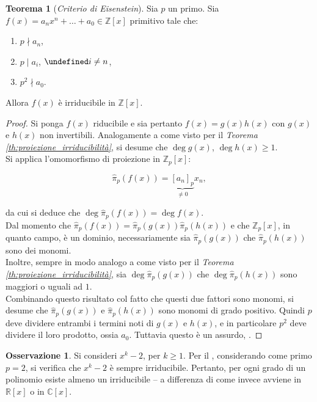 \documentclass[a4paper]{article}
\newcommand{\CCx}{\mathbb{C}[x]}
\newcommand{\RRx}{\mathbb{R}[x]}
\newcommand{\ZZpx}{\mathbb{Z}_p[x]}
\newcommand{\ZZx}{\mathbb{Z}[x]}
\newcommand{\hatpip}{\hat{\pi}_p}
\theoremstyle{definition}
\newtheorem*{note}{Osservazione}
\newtheorem{theorem}{Teorema}[section]
\let\oldforall\forall
\let\forall\undefined
\DeclareMathOperator{\forall}{\oldforall}
\begin{document}
\begin{theorem}[\textit{Criterio di Eisenstein}]
    \label{th:eisenstein}
    Sia $p$ un primo.
    Sia $f(x) = a_n x^n + \ldots + a_0 \in \ZZx$ primitivo tale che:

    \begin{enumerate}[ (1)]
        \item $p \nmid a_n$,
        \item $p \mid a_i$, $\forall i \neq n$,
        \item $p^2 \nmid a_0$.
    \end{enumerate}

    Allora $f(x)$ è irriducibile in $\ZZx$.
\end{theorem}

\begin{proof}
    Si ponga $f(x)$ riducibile e sia pertanto $f(x)=g(x)h(x)$ con
    $g(x)$ e $h(x)$ non invertibili. Analogamente a come visto
    per il \textit{Teorema \ref{th:proiezione_irriducibilità}}, si
    desume che $\deg g(x)$, $\deg h(x) \geq 1$. \\

    Si applica l'omomorfismo di proiezione in $\ZZpx$:

    \[ \hatpip(f(x))=\underbrace{[a_n]_p}_{\neq 0} x_n, \]

    da cui si deduce che $\deg \hatpip(f(x)) = \deg f(x)$. \\

    Dal momento che $\hatpip(f(x))=\hatpip(g(x))\hatpip(h(x))$ e
    che $\ZZpx$, in quanto campo, è un dominio,
    necessariamente sia $\hatpip(g(x))$ che $\hatpip(h(x))$
    sono dei monomi. \\

    Inoltre, sempre in modo analogo a come visto per il \textit{Teorema
        \ref{th:proiezione_irriducibilità}}, sia $\deg \hatpip(g(x))$
    che $\deg \hatpip(h(x))$ sono maggiori o uguali ad $1$. \\

    Combinando questo risultato col fatto che questi due fattori
    sono monomi, si desume che
    $\hatpip(g(x))$ e $\hatpip(h(x))$ sono monomi di grado positivo.
    Quindi $p$ deve dividere entrambi i termini noti di $g(x)$ e
    $h(x)$, e in particolare $p^2$ deve dividere il loro prodotto,
    ossia $a_0$. Tuttavia questo è un assurdo, \Lightning{}.
\end{proof}

\begin{note}
    Si consideri $x^k-2$, per $k \geq 1$.
    Per il ,
    considerando come primo $p=2$, si verifica che
    $x^k-2$ è sempre irriducibile. Pertanto, per ogni
    grado di un polinomio esiste almeno un irriducibile --
    a differenza di come invece avviene in $\RRx$ o in $\CCx$.
\end{note}
\end{document}
